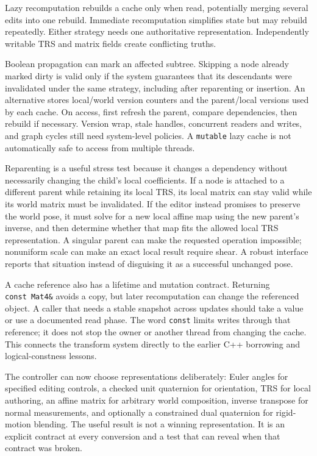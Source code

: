 Lazy recomputation rebuilds a cache only when read, potentially merging several edits into one rebuild. Immediate recomputation simplifies state but may rebuild repeatedly. Either strategy needs one authoritative representation. Independently writable TRS and matrix fields create conflicting truths.

Boolean propagation can mark an affected subtree. Skipping a node already marked dirty is valid only if the system guarantees that its descendants were invalidated under the same strategy, including after reparenting or insertion. An alternative stores local/world version counters and the parent/local versions used by each cache. On access, first refresh the parent, compare dependencies, then rebuild if necessary. Version wrap, stale handles, concurrent readers and writes, and graph cycles still need system-level policies. A \texttt{mutable} lazy cache is not automatically safe to access from multiple threads.

Reparenting is a useful stress test because it changes a dependency without necessarily changing the child's local coefficients. If a node is attached to a different parent while retaining its local TRS, its local matrix can stay valid while its world matrix must be invalidated. If the editor instead promises to preserve the world pose, it must solve for a new local affine map using the new parent's inverse, and then determine whether that map fits the allowed local TRS representation. A singular parent can make the requested operation impossible; nonuniform scale can make an exact local result require shear. A robust interface reports that situation instead of disguising it as a successful unchanged pose.

A cache reference also has a lifetime and mutation contract. Returning \texttt{const\ Mat4\&} avoids a copy, but later recomputation can change the referenced object. A caller that needs a stable snapshot across updates should take a value or use a documented read phase. The word \texttt{const} limits writes through that reference; it does not stop the owner or another thread from changing the cache. This connects the transform system directly to the earlier C++ borrowing and logical-constness lessons.

The controller can now choose representations deliberately: Euler angles for specified editing controls, a checked unit quaternion for orientation, TRS for local authoring, an affine matrix for arbitrary world composition, inverse transpose for normal measurements, and optionally a constrained dual quaternion for rigid-motion blending. The useful result is not a winning representation. It is an explicit contract at every conversion and a test that can reveal when that contract was broken.

